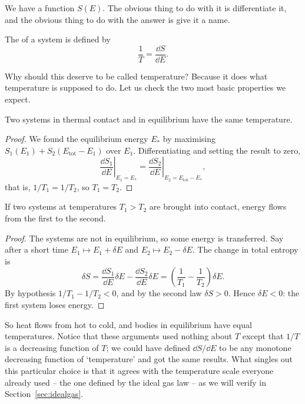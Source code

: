 \documentclass[a4paper]{scrartcl}
\begin{document}
We have a function $S(E)$. The obvious thing to do with it is differentiate it, and the obvious thing to do with the answer is give it a name.

\begin{definition}[Temperature]
	The  of a system is defined by
	$$
	\frac{1}{T} = \frac{\dd S}{\dd E}.
	$$
\end{definition}

Why should this deserve to be called temperature? Because it does what temperature is supposed to do. Let us check the two most basic properties we expect.

\begin{proposition}
	Two systems in thermal contact and in equilibrium have the same temperature.
\end{proposition}
\begin{proof}
	We found the equilibrium energy $E_*$ by maximising $S_1(E_1) + S_2(E_{\mathrm{tot}} - E_1)$ over $E_1$. Differentiating and setting the result to zero,
	$$
	\left.\frac{\dd S_1}{\dd E}\right|_{E_1 = E_*} = \left.\frac{\dd S_2}{\dd E}\right|_{E_2 = E_{\mathrm{tot}} - E_*},
	$$
	that is, $1/T_1 = 1/T_2$, so $T_1 = T_2$.
\end{proof}

\begin{proposition}
	If two systems at temperatures $T_1 > T_2$ are brought into contact, energy flows from the first to the second.
\end{proposition}
\begin{proof}
	The systems are not in equilibrium, so some energy is transferred. Say after a short time $E_1 \mapsto E_1 + \delta E$ and $E_2 \mapsto E_2 - \delta E$. The change in total entropy is
	$$
	\delta S = \frac{\dd S_1}{\dd E}\delta E - \frac{\dd S_2}{\dd E}\delta E = \left(\frac{1}{T_1} - \frac{1}{T_2}\right)\delta E.
	$$
	By hypothesis $1/T_1 - 1/T_2 < 0$, and by the second law $\delta S > 0$. Hence $\delta E < 0$: the first system loses energy.
\end{proof}

So heat flows from hot to cold, and bodies in equilibrium have equal temperatures. Notice that these arguments used nothing about $T$ except that $1/T$ is a decreasing function of $T$; we could have defined $\dd S/\dd E$ to be any monotone decreasing function of `temperature' and got the same results. What singles out this particular choice is that it agrees with the temperature scale everyone already used -- the one defined by the ideal gas law -- as we will verify in Section~\ref{sec:idealgas}.
\end{document}
